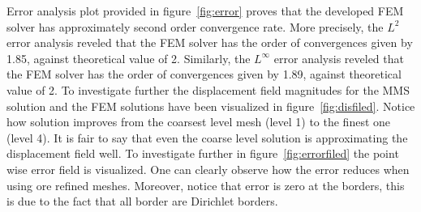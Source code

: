 Error analysis plot provided in figure~\ref{fig:error} proves that the developed FEM solver has approximately second order convergence rate. More precisely, the $L^2$ error analysis reveled that the FEM solver has the order of  convergences given by 1.85, against theoretical value of 2. Similarly,  the $L^\infty$ error analysis reveled that the FEM solver has the order of  convergences given by 1.89, against theoretical value of 2.  To investigate further the displacement  field magnitudes for the MMS solution and the FEM solutions have been visualized in figure~\ref{fig:disfiled}. Notice how solution improves from the coarsest level mesh (level 1) to the finest one (level 4). It is fair to say that even the coarse level solution is approximating the displacement field well. To investigate further in figure~\ref{fig:errorfiled} the point wise error field is visualized. One can clearly  observe how the error reduces when using ore refined meshes. Moreover, notice that error is zero at the borders, this is due to the fact that all border are Dirichlet borders.  

